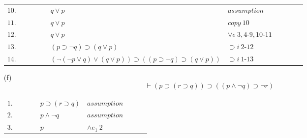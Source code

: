 \documentclass[12pt]{article}
\begin{document}
\begin{itemize}
\begin{table}[H]
\begin{tabular}{*{11}{l}}
			$10.$ & \multicolumn{1}{|c}{} & \multicolumn{1}{|c}{} & \multicolumn{1}{|c}{} & & $q \lor p$ & $assumption$ & & \multicolumn{1}{c|}{}& \multicolumn{1}{c|}{} &\multicolumn{1}{c|}{}\\
			
			$11.$ & \multicolumn{1}{|c}{} & \multicolumn{1}{|c}{} & \multicolumn{1}{|c}{} & & $q \lor p$ & $copy \ 10$ & & \multicolumn{1}{c|}{}& \multicolumn{1}{c|}{} &\multicolumn{1}{c|}{}\\
			
			\cline{4-9}
			
			$12.$ & \multicolumn{1}{|c}{} & \multicolumn{1}{|c}{} & & & $q \lor p$ & $\lor e \ 3, 4$-$9, 10$-$11$ & & & \multicolumn{1}{c|}{} &\multicolumn{1}{c|}{}\\
						
			\cline{3-10}
			
			$13.$ & \multicolumn{1}{|c}{} & & & & $(p \supset \neg q) \supset (q \lor p)$ & $\supset i \ 2$-$12$ & & & &\multicolumn{1}{c|}{}\\
			
			\cline{2-11}
			
			$14.$ & & & & & $(\neg (\neg p \lor q) \lor (q \lor p)) \supset ((p \supset \neg q) \supset (q \lor p))$ & $\supset i \ 1$-$13$ & & & &\\
			
			
			
			
		
		\end{tabular}
		\end{table}
	
	
	\item[(f)]
		\[
			\vdash (p \supset (r \supset q)) \supset ((p \land \neg q) \supset \neg r)
		\]
		\begin{table}[H]
		\centering
		\begin{tabular}{*9{l}}
			
			\cline{2-9}
			
			$1.$ &\multicolumn{1}{|c}{} & & & $p \supset (r \supset q)$ & $assumption$ & & &\multicolumn{1}{c|}{}\\
			
			\cline{3-8}
			
			$2.$ & \multicolumn{1}{|c}{} & \multicolumn{1}{|c}{} &  & $p \land \neg q$ & $assumption$ & & \multicolumn{1}{c|}{} &\multicolumn{1}{c|}{}\\
			
			$3.$ & \multicolumn{1}{|c}{} & \multicolumn{1}{|c}{} & & $p$ & $\land e_1 \ 2$ & & \multicolumn{1}{c|}{} &\multicolumn{1}{c|}{}\\
			

\end{tabular}
\end{table}
\end{itemize}
\end{document}
